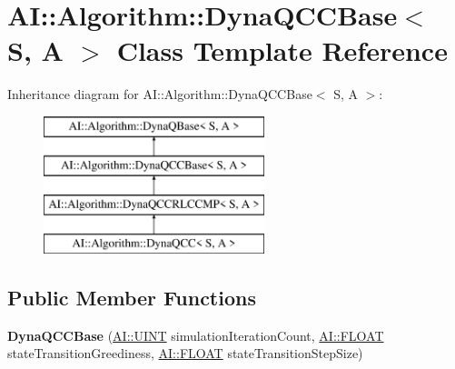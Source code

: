 \hypertarget{classAI_1_1Algorithm_1_1DynaQCCBase}{\section{A\-I\-:\-:Algorithm\-:\-:Dyna\-Q\-C\-C\-Base$<$ S, A $>$ Class Template Reference}
\label{classAI_1_1Algorithm_1_1DynaQCCBase}
}
Inheritance diagram for A\-I\-:\-:Algorithm\-:\-:Dyna\-Q\-C\-C\-Base$<$ S, A $>$\-:\begin{figure}[H]
\begin{center}
\leavevmode
\includegraphics[height=4.000000cm]{classAI_1_1Algorithm_1_1DynaQCCBase}
\end{center}
\end{figure}
\subsection*{Public Member Functions}
\begin{DoxyCompactItemize}
\item 
\hypertarget{classAI_1_1Algorithm_1_1DynaQCCBase_acd1924d5f560d9a7298e442dfa33716a}{{\bfseries Dyna\-Q\-C\-C\-Base} (\hyperlink{namespaceAI_ab6e14dc1e659854858a87e511f1439ec}{A\-I\-::\-U\-I\-N\-T} simulation\-Iteration\-Count, \hyperlink{namespaceAI_a41b74884a20833db653dded3918e05c3}{A\-I\-::\-F\-L\-O\-A\-T} state\-Transition\-Greediness, \hyperlink{namespaceAI_a41b74884a20833db653dded3918e05c3}{A\-I\-::\-F\-L\-O\-A\-T} state\-Transition\-Step\-Size)}\label{classAI_1_1Algorithm_1_1DynaQCCBase_acd1924d5f560d9a7298e442dfa33716a}

\end{DoxyCompactItemize}
